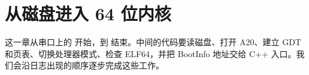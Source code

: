 \chapter{从磁盘进入 64 位内核}

这一章从串口上的  开始，到
 结束。中间的代码要读磁盘、打开 A20、建立
GDT 和页表、切换处理器模式、检查 ELF64，并把 BootInfo 地址交给 C++
入口。我们会沿日志出现的顺序逐步完成这些工作。






